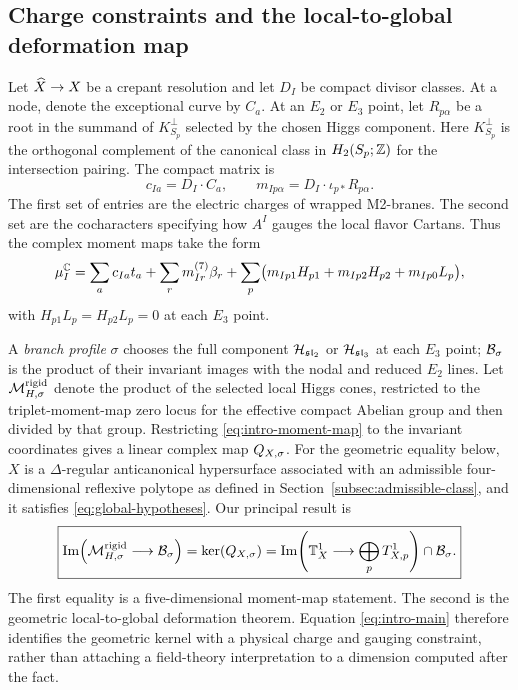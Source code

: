 \subsection*{Charge constraints and the local-to-global deformation map}

Let $\widehat X\to X$ be a crepant resolution and let $D_I$ be compact divisor
classes. At a node, denote the exceptional curve by $C_a$. At an $E_2$ or
$E_3$ point, let $R_{p\alpha}$ be a root in the summand of
$K_{S_p}^{\perp}$ selected by the chosen Higgs component. Here
$K_{S_p}^{\perp}$ is the orthogonal complement of the canonical class in
$H_2(S_p;\mathbb Z)$ for the intersection pairing. The compact matrix is
\begin{equation}
 c_{Ia}=D_I\cdot C_a,
 \qquad
 m_{Ip\alpha}=D_I\cdot\iota_{p*}R_{p\alpha}.
 \label{eq:intro-charges}
\end{equation}
The first set of entries are the electric charges of wrapped M2-branes. The
second set are the cocharacters specifying how $A^I$ gauges the local flavor
Cartans. Thus the complex moment maps take the form
\begin{equation}
 \mu_I^{\mathbb C}
 =\sum_a c_{Ia}t_a
  +\sum_r m^{(7)}_{Ir}\beta_r
  +\sum_p\bigl(m_{Ip1}H_{p1}+m_{Ip2}H_{p2}+m_{Ip0}L_p\bigr),
 \label{eq:intro-moment-map}
\end{equation}
with $H_{p1}L_p=H_{p2}L_p=0$ at each $E_3$ point.

A \emph{branch profile} $\sigma$ chooses the full component
$\mathcal H_{\mathfrak{sl}_2}$ or $\mathcal H_{\mathfrak{sl}_3}$ at each $E_3$ point;
$\mathcal B_{\sigma}$ is the product of their invariant images with the nodal and
reduced $E_2$ lines. Let $\mathcal M_{H,\sigma}^{\mathrm{rigid}}$ denote the product
of the selected local Higgs cones, restricted to the triplet-moment-map zero locus
for the effective compact Abelian group and then divided by that group.
Restricting \eqref{eq:intro-moment-map} to the invariant coordinates gives a
linear complex map $Q_{X,\sigma}$. For the geometric equality below, $X$ is a
$\Delta$-regular anticanonical hypersurface associated with an admissible
four-dimensional reflexive polytope as defined in
Section~\ref{subsec:admissible-class}, and it satisfies
\eqref{eq:global-hypotheses}. Our principal result is
\begin{equation}
 \boxed{
 \operatorname{Im}\!\left(
   \mathcal M_{H,\sigma}^{\mathrm{rigid}}\longrightarrow\mathcal B_{\sigma}
 \right)
 =\ker(Q_{X,\sigma})
 =\operatorname{Im}\!\left(
   \mathbb T^1_X\longrightarrow\bigoplus_pT^1_{X,p}
 \right)\cap\mathcal B_{\sigma}.}
 \label{eq:intro-main}
\end{equation}
The first equality is a five-dimensional moment-map statement. The second is
the geometric local-to-global deformation theorem. Equation
\eqref{eq:intro-main} therefore identifies the geometric kernel with a physical
charge and gauging constraint, rather than attaching a field-theory
interpretation to a dimension computed after the fact.

